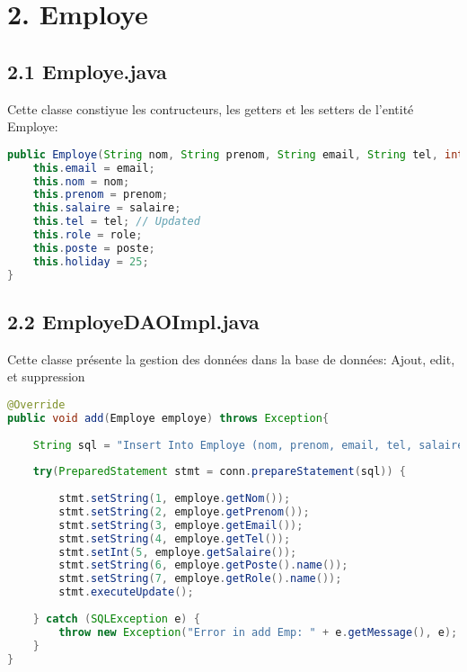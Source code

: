\documentclass[a4paper,12pt]{report}
\begin{document}
\newpage

\section*{\textcolor{myblue}{2. Employe}}

\subsection*{\textcolor{mygreen}{2.1 Employe.java}}
Cette classe constiyue les contructeurs, les getters et les setters de l'entité Employe:
\begin{lstlisting}[language=Java, caption=Constructeur de l'employe]
public Employe(String nom, String prenom, String email, String tel, int salaire, Role role, Poste poste) {
    this.email = email;
    this.nom = nom;
    this.prenom = prenom;
    this.salaire = salaire;
    this.tel = tel; // Updated
    this.role = role;
    this.poste = poste;
    this.holiday = 25;
}
\end{lstlisting}

\subsection*{\textcolor{mygreen}{2.2 EmployeDAOImpl.java}}
Cette classe présente la gestion des données dans la base de données: Ajout, edit, et suppression
\begin{lstlisting}[language=Java, caption=La methodes pour ajouter un employe]
@Override
public void add(Employe employe) throws Exception{
            
    String sql = "Insert Into Employe (nom, prenom, email, tel, salaire, Poste, Role ) values (?,?,?,?,?,?,?)";
    
    try(PreparedStatement stmt = conn.prepareStatement(sql)) {
        
        stmt.setString(1, employe.getNom());
        stmt.setString(2, employe.getPrenom());
        stmt.setString(3, employe.getEmail());
        stmt.setString(4, employe.getTel());
        stmt.setInt(5, employe.getSalaire());
        stmt.setString(6, employe.getPoste().name());
        stmt.setString(7, employe.getRole().name());
        stmt.executeUpdate();
        
    } catch (SQLException e) {
        throw new Exception("Error in add Emp: " + e.getMessage(), e);		
    }
}
\end{lstlisting}
\end{document}
